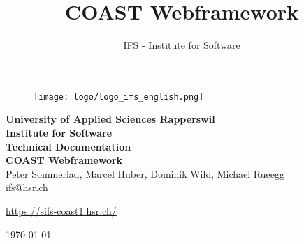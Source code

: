 \documentclass[11pt,a4paper,oneside]{scrreprt}
\title{COAST Webframework}
\author{IFS - Institute for Software}
\begin{document}
\begin{titlepage}
\topmargin 0in
\thispagestyle{empty}
\begin{center}
\begin{figure}[h]
 \centering
 \texttt{[image: logo/logo\_ifs\_english.png]}
\end{figure}
\vspace{1,5cm}
{\Large \bfseries University of Applied Sciences Rapperswil\\} 
\vspace{0,5cm}
{\Large \bfseries Institute for Software\\}
\vspace{2cm}
\sffamily
{\Huge \bfseries Technical Documentation}\\
\vspace{0.5cm}
{\Huge \bfseries COAST Webframework}\\
\vspace{1,5cm}
Peter Sommerlad, Marcel Huber, Dominik Wild, Michael Rueegg\\\url{ifs@hsr.ch}\\\vspace{1,0cm}
\begin{scriptsize}\url{https://sifs-coast1.hsr.ch/}\\\end{scriptsize}
\vspace{2,5cm}
\vspace{0,3cm}
\today
\end{center}
\end{titlepage}

\setcounter{tocdepth}{2}
\tableofcontents



\end{document}
